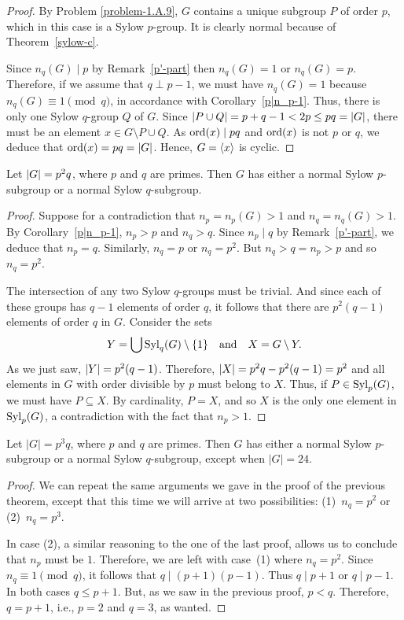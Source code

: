 \begin{proof} By Problem \ref{problem-1.A.9}, $G$ contains a unique subgroup $P$ of order $p$, which in this case is a Sylow $p$-group. It is clearly normal because of Theorem~\ref{sylow-c}.

Since $n_q(G)\mid p$ by Remark~\ref{p'-part} then $n_q(G)=1$ or $n_q(G)=p$. Therefore, if we assume that $q\perp p-1$, we must have $n_q(G)=1$ because $n_q(G)\equiv1\pmod q$, in accordance with Corollary~\ref{p|n_p-1}. Thus, there is only one Sylow $q$-group $Q$ of $G$. Since $\left\vert{P\cup Q}\right\vert=p+q-1<2p\le pq=\left\vert{G}\right\vert$, there must be an element $x\in G\setminus P\cup Q$. As ${\rm ord}(x)\mid pq$ and ${\rm ord}(x)$ is not $p$ or $q$, we deduce that ${\rm ord}(x)=pq=\left\vert{G}\right\vert$. Hence, $G=\langle x\rangle$ is cyclic.  \end{proof}

\begin{thm}\label{thm-p^2q}
    Let\/ $\left\vert{G}\right\vert = p^2q$, where $p$ and $q$ are primes. Then $G$ has either a normal Sylow $p$-subgroup or a normal Sylow $q$-subgroup.
\end{thm}

\begin{proof} Suppose for a contradiction that $n_p=n_p(G)>1$ and $n_q=n_q(G)>1$. By Corollary~\ref{p|n_p-1}, $n_p>p$ and $n_q>q$. Since $n_p\mid q$ by Remark~\ref{p'-part}, we deduce that $n_p=q$. Similarly, $n_q=p$ or $n_q=p^2$. But $n_q>q=n_p>p$ and so $n_q=p^2$.

The intersection of any two Sylow $q$-groups must be trivial. And since each of these groups has $q-1$ elements of order $q$, it follows that there are $p^2(q-1)$ elements of order $q$ in $G$. Consider the sets
$$
    Y = \bigcup{\rm Syl}_q(G)\setminus\{1\}\quad\mathrm{and}\quad X=G\setminus Y.
$$
As we just saw, $\left\vert{Y}\right\vert=p^2(q-1)$. Therefore, $\left\vert{X}\right\vert=p^2q-p^2(q-1)=p^2$ and all elements in $G$ with order divisible by $p$ must belong to $X$. Thus, if $P\in{\rm Syl}_p(G)$, we must have $P\subseteq X$. By cardinality, $P=X$, and so $X$ is the only one element in ${\rm Syl}_p(G)$, a contradiction with the fact that $n_p>1$.  \end{proof}


\begin{thm}\label{thm-p^3q}
    Let $|G|=p^3q$, where $p$ and $q$ are primes. Then $G$ has either a normal Sylow $p$-subgroup or a normal Sylow $q$-subgroup, except when $|G|=24$.
\end{thm}

\begin{proof} We can repeat the same arguments we gave in the proof of the previous theorem, except that this time we will arrive at two possibilities: (1)~$n_q=p^2$ or (2)~$n_q=p^3$.

In case (2), a similar reasoning to the one of the last proof, allows us to conclude that $n_p$ must be $1$. Therefore, we are left with case~(1) where $n_q=p^2$. Since $n_q\equiv1\pmod q$, it follows that $q\mid(p+1)(p-1)$. Thus $q\mid p+1$ or $q\mid p-1$. In both cases $q\le p+1$. But, as we saw in the previous proof, $p<q$. Therefore, $q=p+1$, i.e., $p=2$ and $q=3$, as wanted.  \end{proof}

